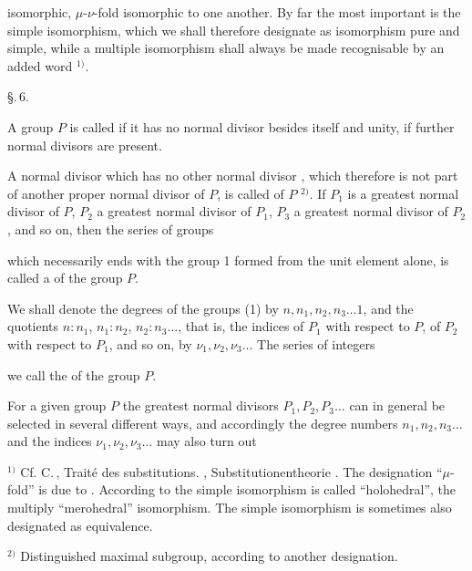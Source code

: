 isomorphic, $\mu$-$\nu$-fold isomorphic to one another. By far
the most important is the simple isomorphism, which we shall
therefore designate as isomorphism pure and simple, while a
multiple isomorphism shall always be made recognisable by an
added word $^{1)}$.

\begin{center}
\S.\,6.

\end{center}

A group $P$ is called  if it has no normal
divisor besides itself and unity,  if further
normal divisors are present.

A normal divisor which has no other normal divisor ,
which therefore is not part of another proper normal divisor
of $P$, is called 
of $P$ $^{2)}$. If $P_1$ is a greatest normal divisor of $P$, $P_2$ a
greatest normal divisor of $P_1$, $P_3$ a greatest normal divisor
of $P_2$, and so on, then the series of groups


which necessarily ends with the group 1 formed from the unit
element alone, is called a  of the
group $P$.

We shall denote the degrees of the groups (1) by $n, n_1, n_2, n_3 \ldots 1$,
and the quotients $n : n_1$, $n_1 : n_2$, $n_2 : n_3 \ldots$, that is,
the indices of $P_1$ with respect to $P$, of $P_2$ with respect to $P_1$, and so on,
by $\nu_1, \nu_2, \nu_3 \ldots$ The series of integers


we call the  of the group $P$.

For a given group $P$ the greatest normal divisors $P_1, P_2, P_3 \ldots$
can in general be selected in several different
ways, and accordingly the degree numbers
$n_1, n_2, n_3 \ldots$ and the indices $\nu_1, \nu_2, \nu_3 \ldots$ may also turn out

$^{1)}$ Cf. C.\,, Traité des substitutions. , Substitutionentheorie
. The designation ``$\mu$-fold'' is due to . According to 
the simple isomorphism is called ``holohedral'', the multiply
``merohedral'' isomorphism. The simple isomorphism is sometimes
 also designated as equivalence.

$^{2)}$ Distinguished maximal subgroup, according to another designation.

